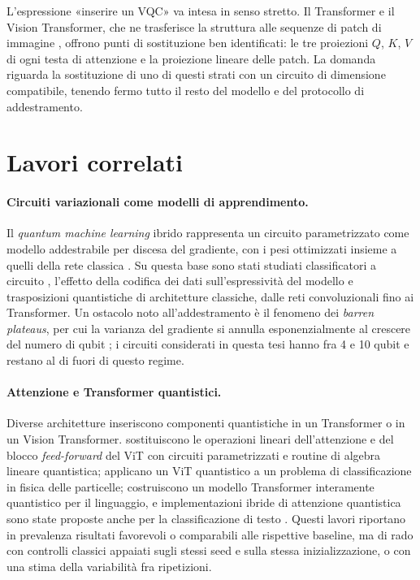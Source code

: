L'espressione «inserire un VQC» va intesa in senso stretto. Il Transformer
\parencite{vaswani2017attention} e il Vision Transformer, che ne trasferisce la
struttura alle sequenze di patch di immagine \parencite{dosovitskiy2020image},
offrono punti di sostituzione ben identificati: le tre proiezioni $Q$, $K$, $V$ di
ogni testa di attenzione e la proiezione lineare delle patch. La domanda riguarda
la sostituzione di uno di questi strati con un circuito di dimensione compatibile,
tenendo fermo tutto il resto del modello e del protocollo di addestramento.

\section{Lavori correlati}
\label{sec:lavori-correlati}

\paragraph{Circuiti variazionali come modelli di apprendimento.}
Il \emph{quantum machine learning} ibrido rappresenta un circuito parametrizzato
come modello addestrabile per discesa del gradiente, con i pesi ottimizzati
insieme a quelli della rete classica
\parencite{biamonte2017qml,cerezo2021variational,mitarai2018quantum}. Su questa
base sono stati studiati classificatori a circuito \parencite{schuld2020circuit},
l'effetto della codifica dei dati sull'espressività del modello
\parencite{schuld2021encoding} e trasposizioni quantistiche di architetture
classiche, dalle reti convoluzionali
\parencite{cong2019qcnn,henderson2020quanvolutional} fino ai Transformer. Un
ostacolo noto all'addestramento è il fenomeno dei \emph{barren plateaus}, per cui
la varianza del gradiente si annulla esponenzialmente al crescere del numero di
qubit \parencite{mcclean2018barren}; i circuiti considerati in questa tesi hanno
fra 4 e 10 qubit e restano al di fuori di questo regime.

\paragraph{Attenzione e Transformer quantistici.}
Diverse architetture inseriscono componenti quantistiche in un Transformer o in un
Vision Transformer. \textcite{cherrat2024quantumvision} sostituiscono le
operazioni lineari dell'attenzione e del blocco \emph{feed-forward} del ViT con
circuiti parametrizzati e routine di algebra lineare quantistica;
\textcite{comajoan2024qvt} applicano un ViT quantistico a un problema di
classificazione in fisica delle particelle; \textcite{khatri2024quixer}
costruiscono un modello Transformer interamente quantistico per il linguaggio, e
implementazioni ibride di attenzione quantistica sono state proposte anche per
la classificazione di testo \parencite{disipio2022dawn}. Questi lavori
riportano in prevalenza risultati favorevoli o comparabili alle rispettive
baseline, ma di rado con controlli classici appaiati sugli stessi seed e sulla
stessa inizializzazione, o con una stima della variabilità fra ripetizioni.

